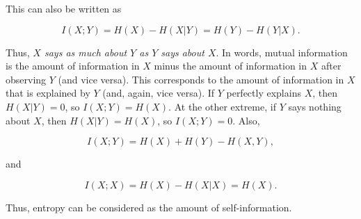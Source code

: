 \noindent This can also be written as

\begin{equation}
	I(X; Y) = H(X) - H(X | Y) = H(Y) - H(Y | X).
\end{equation}

\noindent Thus, \textit{$X$ says as much about $Y$ as $Y$ says about $X$}. In words, mutual information is the amount of information in $X$ minus the amount of information in $X$ after observing $Y$ (and vice versa). This corresponds to the amount of information in $X$ that is explained by $Y$ (and, again, vice versa). If $Y$ perfectly explains $X$, then $H(X | Y) = 0$, so $I(X; Y) = H(X)$. At the other extreme, if $Y$ says nothing about $X$, then $H(X | Y) = H(X)$, so $I(X; Y) = 0$. Also, 

\begin{equation}
	I(X; Y) = H(X) + H(Y) - H(X, Y),
\end{equation}

\noindent and

\begin{equation}
	I(X; X) = H(X) - H(X | X) = H(X).
\end{equation}

\noindent Thus, entropy can be considered as the amount of self-information.
















